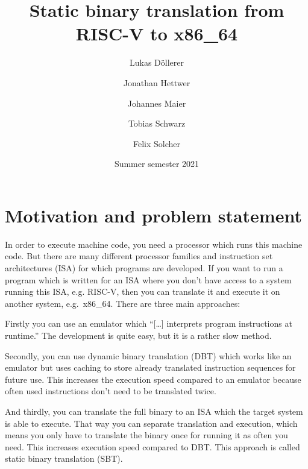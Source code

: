 \documentclass[course=eragp]{aspdoc}
\author{Lukas Döllerer \and Jonathan Hettwer \and Johannes Maier \and Tobias Schwarz \and Felix Solcher}
\date{Summer semester 2021}
\title{Static binary translation from RISC-V to x86\_64}
\begin{document}
\maketitle

\tableofcontents

\pagebreak

\section{Motivation and problem statement}


In order to execute machine code, you need a processor which runs this machine code. But there are
many different processor families and instruction set architectures (ISA) for which programs are
developed. If you want to run a program which is written for an ISA where you don't have access to a
system running this ISA, e.g. RISC-V, then you can translate it and execute it on another system,
e.g.\ x86\_64. There are three main approaches:

\par

Firstly you can use an emulator which ``[\ldots] interprets program instructions at
runtime.''\cite{binary_translation} The development is quite easy, but it is a rather slow method.

\par

Secondly, you can use dynamic binary translation (DBT) which works like an emulator but uses caching
to store already translated instruction sequences for future use. This increases the execution speed
compared to an emulator because often used instructions don't need to be translated
twice.\cite{binary_translation}

\par

And thirdly, you can translate the full binary to an ISA which the target system is able to execute.
That way you can separate translation and execution, which means you only have to translate the
binary once for running it as often you need. This increases execution speed compared to DBT. This
approach is called static binary translation (SBT).\cite{binary_translation}
\end{document}
